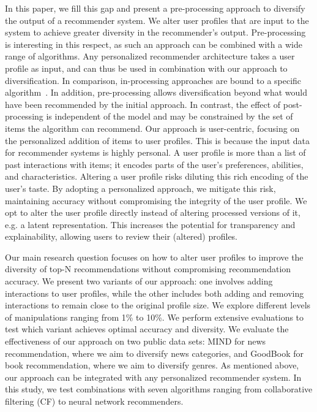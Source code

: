 \documentclass[runningheads]{llncs}
\begin{document}
In this paper, we fill this gap and present a pre-processing approach to diversify the output of a recommender system. 
We alter user profiles that are input to the system to achieve greater diversity in the recommender's output. 
Pre-processing is interesting in this respect, as such an approach can be combined with a wide range of algorithms. 
Any personalized recommender architecture takes a user profile as input, and can thus be used in combination with our approach to diversification. 
In comparison, in-processing approaches are bound to a specific algorithm~\cite{zhao2023fairness}. 
In addition, pre-processing allows diversification beyond what would have been recommended by the initial approach. 
In contrast, the effect of post-processing is independent of the model and may be constrained by the set of items the algorithm can recommend. 
Our approach is user-centric, focusing on the personalized addition of items to user profiles. 
This is because the input data for recommender systems is highly personal. 
A user profile is more than a list of past interactions with items; it encodes parts of the user's preferences, abilities, and characteristics. 
Altering a user profile risks diluting this rich encoding of the user's taste. 
By adopting a personalized approach, we mitigate this risk, maintaining accuracy without compromising the integrity of the user profile. 
We opt to alter the user profile directly instead of altering processed versions of it, e.g. a latent representation. 
This increases the potential for transparency and explainability, allowing users to review their (altered) profiles. 


Our main research question focuses on how to alter user profiles to improve the diversity of top-N recommendations without compromising recommendation accuracy.
We present two variants of our approach: one involves adding interactions to user profiles, while the other includes both adding and removing interactions to remain close to the original profile size. 
We explore different levels of manipulations ranging from 1\% to 10\%. 
We perform extensive evaluations to test which variant achieves optimal accuracy and diversity. 
We evaluate the effectiveness of our approach on two public data sets: 
MIND for news recommendation, where we aim to diversify news categories, and GoodBook for book recommendation, where we aim to diversify genres.
As mentioned above, our approach can be integrated with any personalized recommender system. 
In this study, we test combinations with seven algorithms ranging from collaborative filtering (CF) to neural network recommenders.
\end{document}
